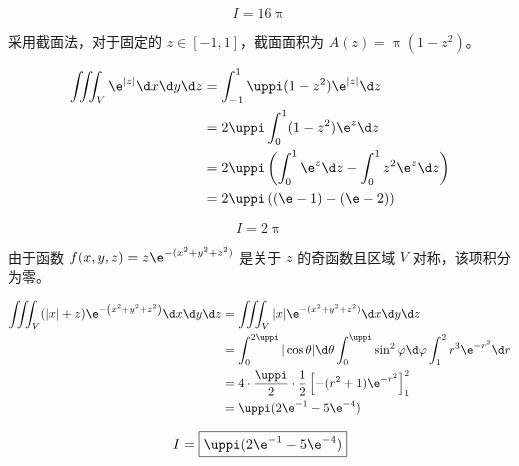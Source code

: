 \begin{solution}
    \begin{equation}
        I = \boxed{16 \uppi}
    \end{equation}

    采用截面法，对于固定的 $z \in [-1, 1]$，截面面积为 $A(z) = \uppi(1-z^2)$。

    \begin{equation}
        \begin{aligned}
            \iiint_{V} \e^{|z|} \d x \d y \d z & = \int_{-1}^{1} \uppi (1-z^2) \e^{|z|} \d z                                  \\
                                               & = 2 \uppi \int_{0}^{1} (1-z^2) \e^z \d z                                     \\
                                               & = 2 \uppi \left( \int_{0}^{1} \e^z \d z - \int_{0}^{1} z^2 \e^z \d z \right) \\
                                               & = 2 \uppi \left( (\e - 1) - (\e - 2) \right) \label{eq:I7}
        \end{aligned}
    \end{equation}

    \begin{equation}
        I = \boxed{2 \uppi}
    \end{equation}

    由于函数 $f(x, y, z) = z \e^{-(x^2+y^2+z^2)}$ 是关于 $z$ 的奇函数且区域 $V$ 对称，该项积分为零。

    \begin{equation}
        \begin{aligned}
            \iiint_{V}(|x|+z) \e^{-\left(x^{2}+y^{2}+z^{2}\right)} \d x \d y \d z & = \iiint_{V} |x| \e^{-(x^2+y^2+z^2)} \d x \d y \d z                                                                     \\
                                                                                  & = \int_{0}^{2 \uppi} |\cos \theta| \d \theta \int_{0}^{\uppi} \sin^2 \varphi \d \varphi \int_{1}^{2} r^3 \e^{-r^2} \d r \\
                                                                                  & = 4 \cdot \frac{\uppi}{2} \cdot \frac{1}{2} \left[ -(r^2+1) \e^{-r^2} \right]_{1}^{2}                                   \\
                                                                                  & = \uppi (2 \e^{-1} - 5 \e^{-4}) \label{eq:I8}
        \end{aligned}
    \end{equation}

    \begin{equation}
        I = \boxed{\uppi(2 \e^{-1} - 5 \e^{-4})}
    \end{equation}
\end{solution}


